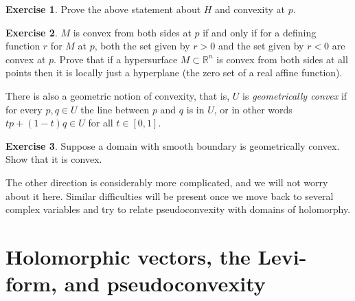 \documentclass[12pt,openany]{book}
\newcommand{\R}{{\mathbb{R}}}
\newcommand{\myindex}[1]{#1\index{#1}}
\theoremstyle{plain}
\theoremstyle{remark}
\theoremstyle{definition}
\newenvironment{exbox}{%
    \def\FrameCommand{\vrule width 1pt \relax\hspace {10pt}}%
    \MakeFramed {\advance \hsize -\width \FrameRestore }%
}{%
    \endMakeFramed
}
\theoremstyle{exercise}
\newtheorem{exercise}{Exercise}[section]
\theoremstyle{example}
\begin{document}
\begin{exbox}
\begin{exercise}
Prove the above statement about $H$ and convexity at $p$.
\end{exercise}

\begin{exercise}
$M$ is convex from both sides at $p$ if and only if for a
defining function $r$ for $M$ at $p$, both the set given by
$r > 0$ and the set given by $r < 0$ are convex at $p$.
Prove that if a hypersurface $M \subset \R^n$ is convex from both sides at all
points then it is locally just a hyperplane (the zero set of a real affine
function).
\end{exercise}
\end{exbox}

There is also a geometric notion of convexity, that is, $U$ is
\emph{\myindex{geometrically convex}} if for every $p,q \in U$ the
line between $p$ and $q$ is in $U$, or in other words
$tp +(1-t)q \in U$ for all $t \in [0,1]$.

\begin{exbox}
\begin{exercise}
Suppose a domain with smooth
boundary is geometrically
convex.  Show that it is convex.
\end{exercise}
\end{exbox}

The other direction is considerably more complicated, and we will not worry
about it here.  Similar difficulties will be present once we move back to
several complex variables and try to relate pseudoconvexity with domains of
holomorphy.


\section{Holomorphic vectors, the Levi-form, and pseudoconvexity}
\end{document}
